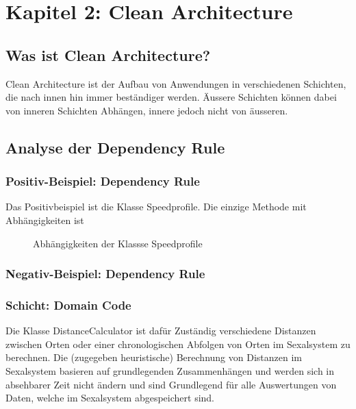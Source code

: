 \section{Kapitel 2: Clean Architecture}

\subsection{Was ist Clean Architecture?}

Clean Architecture ist der Aufbau von Anwendungen in verschiedenen Schichten, die nach innen hin immer beständiger werden. Äussere Schichten können dabei von inneren Schichten Abhängen, innere jedoch nicht von äusseren.

\subsection{Analyse der Dependency Rule}

\subsubsection{Positiv-Beispiel: Dependency Rule}

Das Positivbeispiel ist die Klasse Speedprofile. Die einzige Methode mit Abhängigkeiten ist 

\begin{figure}[h]
  \centering
  
  \caption{Abhängigkeiten der Klassse Speedprofile}
\end{figure}


\subsubsection{Negativ-Beispiel: Dependency Rule}

\subsubsection{Schicht: Domain Code}

Die Klasse DistanceCalculator ist dafür Zuständig verschiedene Distanzen zwischen Orten oder einer chronologischen Abfolgen von Orten im Sexalsystem zu berechnen.
Die (zugegeben heuristische) Berechnung von Distanzen im Sexalsystem basieren auf grundlegenden Zusammenhängen und werden sich in absehbarer Zeit nicht ändern und sind Grundlegend für alle Auswertungen von Daten, welche im Sexalsystem abgespeichert sind.

